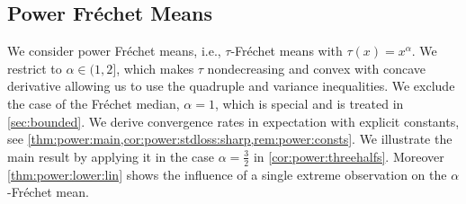 \documentclass{article}
\newcommand{\tran}{\tau}
\begin{document}
\subsection{Power Fr\'echet Means}\label{sec:power}
%
We consider power Fr\'echet means, i.e., $\tran$-Fr\'echet means with $\tran(x) = x^\alpha$. We restrict to $\alpha\in (1, 2]$, which makes $\tran$ nondecreasing and convex with concave derivative allowing us to use the quadruple and variance inequalities. We exclude the case of the Fr\'echet median, $\alpha=1$, which is special and is treated in \cref{sec:bounded}. We derive convergence rates in expectation with explicit constants, see \cref{thm:power:main,cor:power:stdloss:sharp,rem:power:consts}. We illustrate the main result by applying it in the case $\alpha= \frac32$ in \cref{cor:power:threehalfs}. Moreover \cref{thm:power:lower:lin} shows the influence of a single extreme observation on the $\alpha$-Fr\'echet mean.
\end{document}
